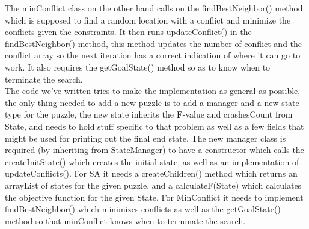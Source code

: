 \documentclass[12pt, a4paper]{article}
\begin{document}
The minConflict class on the other hand calls on the findBestNeighbor() method which is supposed to find a random location with a conflict and minimize the conflicts given the constraints. It then runs updateConflict() in the findBestNeighbor() method, this method updates the number of conflict and the conflict array so the next iteration has a correct indication of where it can go to work. It also requires the getGoalState() method so as to know when to terminate the search.\\
The code we've written tries to make the implementation as general as possible, the only thing needed to add a new puzzle is to add a manager and a new state type for the puzzle, the new state inherits the \textbf{F}-value and crashesCount from State, and needs to hold stuff specific to that problem as well as a few fields that might be used for printing out the final end state. The new manager class is required (by inheriting from StateManager) to have a constructor which calls the createInitState() which creates the initial state, as well as an implementation of updateConflicts(). For SA it needs a createChildren() method which returns an arrayList of states for the given puzzle, and a calculateF(State) which calculates the objective function for the given State. For MinConflict it needs to implement findBestNeighbor() which minimizes conflicts as well as the getGoalState() method so that minConflict knows when to terminate the search.
\end{document}

